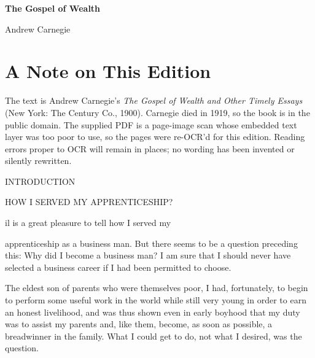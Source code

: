 \documentclass[11pt,openany]{book}
\begin{document}
\begin{titlepage}
\centering
\vspace*{1.7in}
{\sffamily\bfseries\fontsize{34}{40}\selectfont The Gospel of Wealth\par}
\vspace{0.42in}
{\sffamily\large Andrew Carnegie\par}
\vspace{0.18in}{\sffamily\small and Other Timely Essays\par}
\vspace{0.18in}{\sffamily\small 1900\par}
\vfill
\end{titlepage}

\pagestyle{fancy}
\chapter*{A Note on This Edition}

The text is Andrew Carnegie's \emph{The Gospel of Wealth and Other Timely Essays} (New York: The Century Co., 1900). Carnegie died in 1919, so the book is in the public domain. The supplied PDF is a page-image scan whose embedded text layer was too poor to use, so the pages were re-OCR'd for this edition. Reading errors proper to OCR will remain in places; no wording has been invented or silently rewritten.

\tableofcontents
\clearpage
{}
\pagestyle{fancy}

INTRODUCTION

HOW I SERVED MY APPRENTICESHIP?

il is a great pleasure to tell how I served my

apprenticeship as a business man. But there seems to be a question preceding this: Why did I become a business man? I am sure that I should never have selected a business career if I had been permitted to choose.

The eldest son of parents who were themselves poor, I had, fortunately, to begin to perform some useful work in the world while still very young in order to earn an honest livelihood, and was thus shown even in early boyhood that my duty was to assist my parents and, like them, become, as soon as possible, a breadwinner in the family. What I could get to do, not what I desired, was the question.
\end{document}
